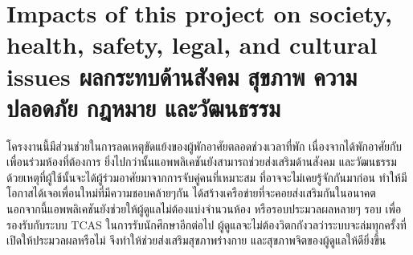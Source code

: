 

\section{\ifenglish%
      Impacts of this project on society, health, safety, legal, and cultural issues
  \else%
      ผลกระทบด้านสังคม สุขภาพ ความปลอดภัย กฎหมาย และวัฒนธรรม
  \fi}

โครงงานนี้มีส่วนช่วยในการลดเหตุขัดแย้งของผู้พักอาศัยตลอดช่วงเวลาที่พัก
เนื่องจากได้พักอาศัยกับเพื่อนร่วมห้องที่ต้องการ ยิ่งไปกว่านั้นแอพพลิเคชันยังสามารถช่วยส่งเสริมด้านสังคม 
และวัฒนธรรม ด้วยเหตุที่ผู้ใช้นั้นจะได้ผู้ร่วมอาศัยมาจากการจับคู่คนที่เหมาะสม ที่อาจจะไม่เคยรู้จักกันมาก่อน ทำให้มีโอกาสได้เจอเพื่อนใหม่ที่มีความชอบคล้ายๆกัน 
ได้สร้างเครือข่ายที่จะคอยส่งเสริมกันในอนาคต นอกจากนี้แอพพลิเคชันยังช่วยให้ผู้ดูแลไม่ต้องแบ่งจำนวนห้อง 
หรือรอบประมวลผลหลายๆ รอบ เพื่อรองรับกับระบบ TCAS ในการรับนักศึกษาอีกต่อไป
ผู้ดูแลจะไม่ต้องวิตกกังวลว่าระบบจะล่มทุกครั้งที่เปิดให้ประมวลผลหรือไม่ จึงทำให้ช่วยส่งเสริมสุขภาพร่างกาย 
และสุขภาพจิตของผู้ดูแลให้ดียิ่งขึ้น


